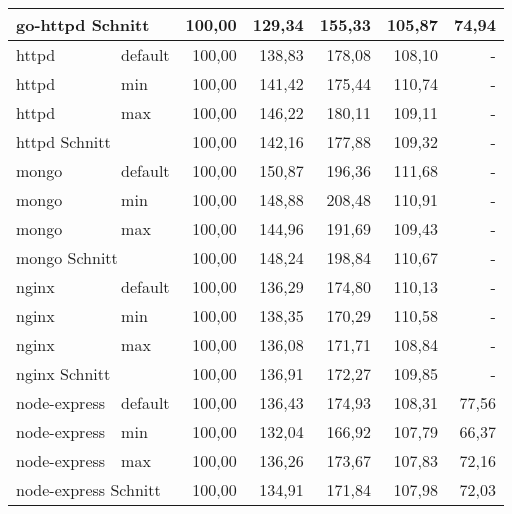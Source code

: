 \begin{footnotesize}
\begin{longtable}{llrrrrr}
		\multicolumn{2}{l}{go-httpd Schnitt}       & 100,00 & 129,34 & 155,33  & 105,87                         & 74,94 \\ \hline
		httpd                    & default         & 100,00 & 138,83 & 178,08  & 108,10                         & -     \\
		httpd                    & min             & 100,00 & 141,42 & 175,44  & 110,74                         & -     \\
		httpd                    & max             & 100,00 & 146,22 & 180,11  & 109,11                         & -     \\ \hline
		\multicolumn{2}{l}{httpd Schnitt}          & 100,00 & 142,16 & 177,88  & 109,32                         & -     \\ \hline
		mongo                    & default         & 100,00 & 150,87 & 196,36  & 111,68                         & -     \\
		mongo                    & min             & 100,00 & 148,88 & 208,48  & 110,91                         & -     \\
		mongo                    & max             & 100,00 & 144,96 & 191,69  & 109,43                         & -     \\ \hline
		\multicolumn{2}{l}{mongo Schnitt}          & 100,00 & 148,24 & 198,84  & 110,67                         & -     \\ \hline
		nginx                    & default         & 100,00 & 136,29 & 174,80  & 110,13                         & -     \\
		nginx                    & min             & 100,00 & 138,35 & 170,29  & 110,58                         & -     \\
		nginx                    & max             & 100,00 & 136,08 & 171,71  & 108,84                         & -     \\ \hline
		\multicolumn{2}{l}{nginx Schnitt}          & 100,00 & 136,91 & 172,27  & 109,85                         & -     \\ \hline
		node-express             & default         & 100,00 & 136,43 & 174,93  & 108,31                         & 77,56 \\
		node-express             & min             & 100,00 & 132,04 & 166,92  & 107,79                         & 66,37 \\
		node-express             & max             & 100,00 & 136,26 & 173,67  & 107,83                         & 72,16 \\ \hline
		\multicolumn{2}{l}{node-express Schnitt}   & 100,00 & 134,91 & 171,84  & 107,98                         & 72,03 \\ \hline

\end{longtable}
\end{footnotesize}
